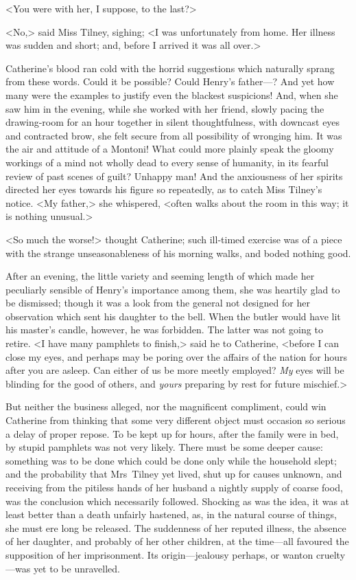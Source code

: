  <You were with her, I suppose, to the last?> 

 <No,> said Miss Tilney, sighing; <I was unfortunately from home. Her illness was sudden and short; and, before I arrived it was all over.> 

 Catherine's blood ran cold with the horrid suggestions which naturally sprang from these words. Could it be possible? Could Henry's father—? And yet how many were the examples to justify even the blackest suspicions! And, when she saw him in the evening, while she worked with her friend, slowly pacing the drawing-room for an hour together in silent thoughtfulness, with downcast eyes and contracted brow, she felt secure from all possibility of wronging him. It was the air and attitude of a Montoni! What could more plainly speak the gloomy workings of a mind not wholly dead to every sense of humanity, in its fearful review of past scenes of guilt? Unhappy man! And the anxiousness of her spirits directed her eyes towards his figure so repeatedly, as to catch Miss Tilney's notice. <My father,> she whispered, <often walks about the room in this way; it is nothing unusual.> 

 <So much the worse!> thought Catherine; such ill-timed exercise was of a piece with the strange unseasonableness of his morning walks, and boded nothing good. 

 After an evening, the little variety and seeming length of which made her peculiarly sensible of Henry's importance among them, she was heartily glad to be dismissed; though it was a look from the general not designed for her observation which sent his daughter to the bell. When the butler would have lit his master's candle, however, he was forbidden. The latter was not going to retire. <I have many pamphlets to finish,> said he to Catherine, <before I can close my eyes, and perhaps may be poring over the affairs of the nation for hours after you are asleep. Can either of us be more meetly employed? \textit{My} eyes will be blinding for the good of others, and \textit{yours} preparing by rest for future mischief.> 

 But neither the business alleged, nor the magnificent compliment, could win Catherine from thinking that some very different object must occasion so serious a delay of proper repose. To be kept up for hours, after the family were in bed, by stupid pamphlets was not very likely. There must be some deeper cause: something was to be done which could be done only while the household slept; and the probability that Mrs~Tilney yet lived, shut up for causes unknown, and receiving from the pitiless hands of her husband a nightly supply of coarse food, was the conclusion which necessarily followed. Shocking as was the idea, it was at least better than a death unfairly hastened, as, in the natural course of things, she must ere long be released. The suddenness of her reputed illness, the absence of her daughter, and probably of her other children, at the time—all favoured the supposition of her imprisonment. Its origin—jealousy perhaps, or wanton cruelty—was yet to be unravelled. 

